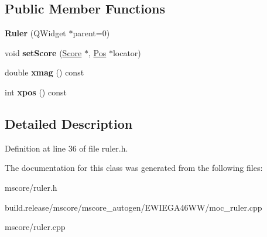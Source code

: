 \subsection*{Public Member Functions}
\begin{DoxyCompactItemize}
\item 
\mbox{\label{class_ms_1_1_ruler_aaf92600ec102e46cce61f0ede0355490}} 
{\bfseries Ruler} (Q\+Widget $\ast$parent=0)
\item 
\mbox{\label{class_ms_1_1_ruler_a240393e343ea7f932221621d9082f79a}} 
void {\bfseries set\+Score} (\hyperlink{class_ms_1_1_score}{Score} $\ast$, \hyperlink{class_ms_1_1_pos}{Pos} $\ast$locator)
\item 
\mbox{\label{class_ms_1_1_ruler_a3e0d477702a5c74611ea70375e5e2f21}} 
double {\bfseries xmag} () const
\item 
\mbox{\label{class_ms_1_1_ruler_ac1039ea139135e19fc9d0fc2650f01dc}} 
int {\bfseries xpos} () const
\end{DoxyCompactItemize}


\subsection{Detailed Description}


Definition at line 36 of file ruler.\+h.



The documentation for this class was generated from the following files\+:\begin{DoxyCompactItemize}
\item 
mscore/ruler.\+h\item 
build.\+release/mscore/mscore\+\_\+autogen/\+E\+W\+I\+E\+G\+A46\+W\+W/moc\+\_\+ruler.\+cpp\item 
mscore/ruler.\+cpp\end{DoxyCompactItemize}
